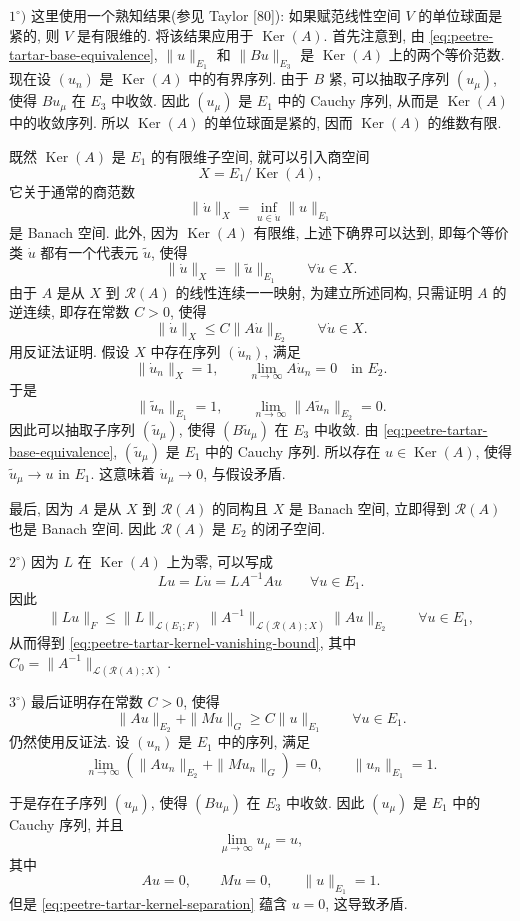 \begin{Proof}
$1^\circ)$ 这里使用一个熟知结果(参见 Taylor [80]): 如果赋范线性空间 $V$ 的单位球面是紧的,
则 $V$ 是有限维的. 将该结果应用于 $\operatorname{Ker}(A)$. 首先注意到, 由
\eqref{eq:peetre-tartar-base-equivalence}, $\|u\|_{E_1}$ 和 $\|Bu\|_{E_3}$ 是
$\operatorname{Ker}(A)$ 上的两个等价范数. 现在设 $(u_n)$ 是 $\operatorname{Ker}(A)$ 中的有界序列.
由于 $B$ 紧, 可以抽取子序列 $(u_\mu)$, 使得 $Bu_\mu$ 在 $E_3$ 中收敛. 因此 $(u_\mu)$ 是
$E_1$ 中的 Cauchy 序列, 从而是 $\operatorname{Ker}(A)$ 中的收敛序列. 所以
$\operatorname{Ker}(A)$ 的单位球面是紧的, 因而 $\operatorname{Ker}(A)$ 的维数有限.

既然 $\operatorname{Ker}(A)$ 是 $E_1$ 的有限维子空间, 就可以引入商空间
\[
X=E_1/\operatorname{Ker}(A),
\]
它关于通常的商范数
\[
\|\dot u\|_X=\inf_{u\in\dot u}\|u\|_{E_1}
\]
是 Banach 空间. 此外, 因为 $\operatorname{Ker}(A)$ 有限维, 上述下确界可以达到, 即每个等价类
$\dot u$ 都有一个代表元 $\tilde u$, 使得
\[
\|\dot u\|_X=\|\tilde u\|_{E_1}\qquad\forall\dot u\in X.
\]
由于 $A$ 是从 $X$ 到 $\mathcal R(A)$ 的线性连续一一映射, 为建立所述同构, 只需证明 $A$ 的逆连续,
即存在常数 $C>0$, 使得
\begin{equation}\label{eq:peetre-tartar-quotient-inverse-bound}
\|\dot u\|_X\leq C\|A\dot u\|_{E_2}\qquad\forall\dot u\in X.
\end{equation}
用反证法证明. 假设 $X$ 中存在序列 $(\dot u_n)$, 满足
\[
\|\dot u_n\|_X=1,\qquad\lim_{n\to\infty}A\dot u_n=0\quad\text{in }E_2.
\]
于是
\[
\|\tilde u_n\|_{E_1}=1,\qquad
\lim_{n\to\infty}\|A\tilde u_n\|_{E_2}=0.
\]
因此可以抽取子序列 $(\tilde u_\mu)$, 使得 $(B\tilde u_\mu)$ 在 $E_3$ 中收敛.
由 \eqref{eq:peetre-tartar-base-equivalence}, $(\tilde u_\mu)$ 是 $E_1$ 中的 Cauchy 序列.
所以存在 $u\in\operatorname{Ker}(A)$, 使得 $\tilde u_\mu\to u$ in $E_1$.
这意味着 $\dot u_\mu\to0$, 与假设矛盾.

最后, 因为 $A$ 是从 $X$ 到 $\mathcal R(A)$ 的同构且 $X$ 是 Banach 空间, 立即得到
$\mathcal R(A)$ 也是 Banach 空间. 因此 $\mathcal R(A)$ 是 $E_2$ 的闭子空间.

$2^\circ)$ 因为 $L$ 在 $\operatorname{Ker}(A)$ 上为零, 可以写成
\[
Lu=L\dot u=LA^{-1}Au\qquad\forall u\in E_1.
\]
因此
\[
\|Lu\|_F\leq\|L\|_{\mathcal L(E_1;F)}
\|A^{-1}\|_{\mathcal L(\mathcal R(A);X)}\|Au\|_{E_2}\qquad\forall u\in E_1,
\]
从而得到 \eqref{eq:peetre-tartar-kernel-vanishing-bound}, 其中
$C_0=\|A^{-1}\|_{\mathcal L(\mathcal R(A);X)}$.

$3^\circ)$ 最后证明存在常数 $C>0$, 使得
\[
\|Au\|_{E_2}+\|Mu\|_G\geq C\|u\|_{E_1}\qquad\forall u\in E_1.
\]
仍然使用反证法. 设 $(u_n)$ 是 $E_1$ 中的序列, 满足
\[
\lim_{n\to\infty}(\|Au_n\|_{E_2}+\|Mu_n\|_G)=0,\qquad\|u_n\|_{E_1}=1.
\]

于是存在子序列 $(u_\mu)$, 使得 $(Bu_\mu)$ 在 $E_3$ 中收敛. 因此 $(u_\mu)$ 是 $E_1$ 中的
Cauchy 序列, 并且
\[
\lim_{\mu\to\infty}u_\mu=u,
\]
其中
\[
Au=0,\qquad Mu=0,\qquad\|u\|_{E_1}=1.
\]
但是 \eqref{eq:peetre-tartar-kernel-separation} 蕴含 $u=0$, 这导致矛盾.
\end{Proof}

